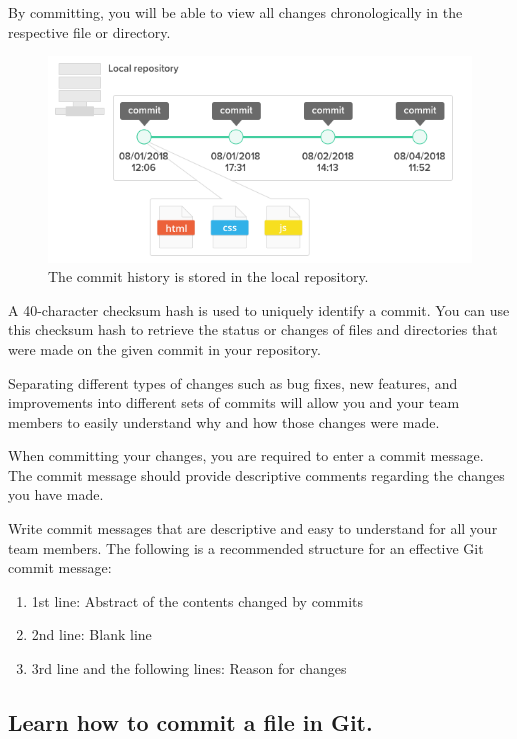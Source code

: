 \documentclass[10pt,a4paper,english]{report}
\begin{document}
    By committing, you will be able to view all changes chronologically in the respective file or directory.

    \begin{figure}[ht]
    \begin{center}
    \includegraphics[scale=0.5]{images/recording_changes_001.png}
    \end{center}
    \caption{The commit history is stored in the local repository.}
    \end{figure}


    A 40-character checksum hash is used to uniquely identify a commit. You can use this checksum hash to retrieve the status or changes of files and directories that were made on the given commit in your repository.

    Separating different types of changes such as bug fixes, new features, and improvements into different sets of commits will allow you and your team members to easily understand why and how those changes were made.

    When committing your changes, you are required to enter a commit message. The commit message should provide descriptive comments regarding the changes you have made.

    Write commit messages that are descriptive and easy to understand for all your team members. The following is a recommended structure for an effective Git commit message:
    \begin{enumerate}
        \item 1st line: Abstract of the contents changed by commits
        \item 2nd line: Blank line
        \item 3rd line and the following lines: Reason for changes
    \end{enumerate}

    \subsection{Learn how to commit a file in Git.}
\end{document}

